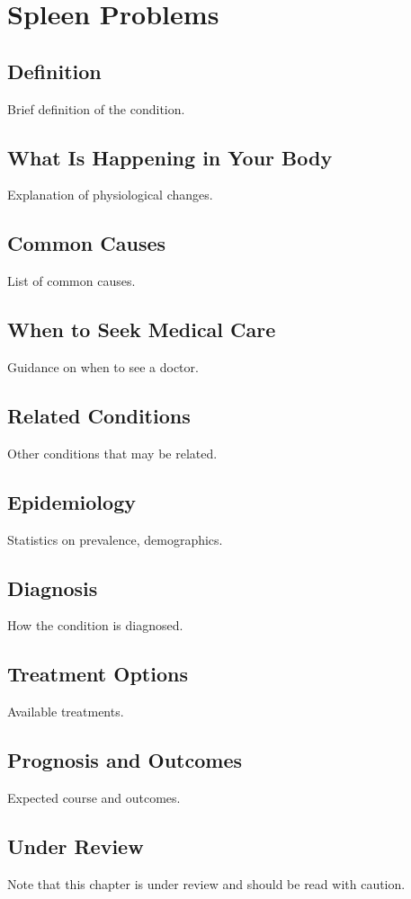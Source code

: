 \chapter{Spleen Problems}
\section*{Definition}
Brief definition of the condition.

\section*{What Is Happening in Your Body}
Explanation of physiological changes.

\section*{Common Causes}
List of common causes.

\section*{When to Seek Medical Care}
Guidance on when to see a doctor.

\section*{Related Conditions}
Other conditions that may be related.

\section*{Epidemiology}
Statistics on prevalence, demographics.

\section*{Diagnosis}
How the condition is diagnosed.

\section*{Treatment Options}
Available treatments.

\section*{Prognosis and Outcomes}
Expected course and outcomes.

\section*{Under Review}
Note that this chapter is under review and should be read with caution.
